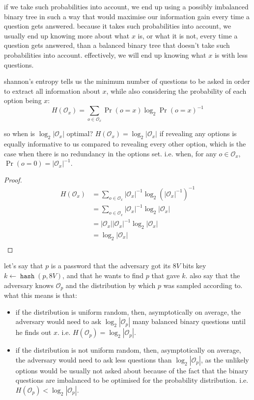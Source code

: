 \documentclass[twocolumn]{article}
\DeclareMathOperator{\hash}{\mathtt{hash}}
\begin{document}
if we take such probabilities into account, we end up using a possibly
imbalanced binary tree in such a way that would maximise our information
gain every time a question gets answered.  because it takes such
probabilities into account, we usually end up knowing more about what $x$
is, or what it is not, every time a question gets answered, than a balanced
binary tree that doesn't take such probabilities into account.
effectively, we will end up knowing what $x$ is with less questions.

shannon's entropy tells us the minimum number of questions to be asked in
order to extract all information about $x$, while also considering the
probability of each option being $x$:
\begin{equation}
    H(\mathcal{O}_x) = \sum_{o \in \mathcal{O}_x}
        \Pr(o=x) \log_2 \Pr(o=x)^{-1}
\end{equation}

so when is $\log_2 |\mathcal{O}_x|$ optimal?  $H(\mathcal{O}_x) = \log_2
|\mathcal{O}_x|$ if revealing any options is equally informative to us
compared to revealing every other option, which is the case when there is
no redundancy in the options set.  i.e. when,  for any $o \in
\mathcal{O}_x$, $\Pr(o=0) = |\mathcal{O}_x|^{-1}$.
\begin{proof}
\begin{equation}
\begin{split}
    H(\mathcal{O}_x)
    &= \sum_{o \in \mathcal{O}_x} |\mathcal{O}_x|^{-1} \log_2
        (|\mathcal{O}_x|^{-1})^{-1} \\
    &= \sum_{o \in \mathcal{O}_x} |\mathcal{O}_x|^{-1} \log_2
        |\mathcal{O}_x| \\
    &= |\mathcal{O}_x| |\mathcal{O}_x|^{-1} \log_2 |\mathcal{O}_x| \\
    &= \log_2 |\mathcal{O}_x| \\
\end{split}
\end{equation}
\end{proof}

let's say that $p$ is a password that the adversary got its $8V$ bits key
$k \gets \hash(p, 8V)$, and that he wants to find $p$ that gave $k$.  also
say that the adversary knows $\mathcal{O}_p$ and the distribution by which
$p$ was sampled according to.  what this means is that:
\begin{itemize}
    \item if the distribution is uniform random, then, asymptotically on
    average, the adversary would need to ask $\log_2 |\mathcal{O}_p|$ many
    balanced binary questions until he finds out $x$.  i.e.
    $H(\mathcal{O}_p) = \log_2 |\mathcal{O}_p|$.

    \item if the distribution is not uniform random, then, asymptotically
    on average, the adversary would need to ask less questions than $\log_2
    |\mathcal{O}_p|$, as the unlikely options would be usually not asked
    about because of the fact that the binary questions are imbalanced to
    be optimised for the probability distribution.  i.e.  $H(\mathcal{O}_p)
    < \log_2 |\mathcal{O}_p|$.
\end{itemize}
\end{document}

